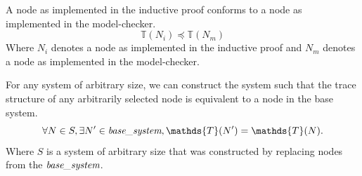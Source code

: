 \documentclass[runningheads]{llncs}
\newcommand{\basesystem}{\emph{base\_system}}
\newcommand{\tracestruc}[1]{\mathds{T}(#1)}
\newif\ifcomments
\newcommand{\egm}[1]{\ifcomments\textcolor{orange}{egm: #1}\fi}
\newcommand{\krs}[1]{\ifcomments\textcolor{blue}{krs: #1}\fi}
\begin{document}
\begin{lemma}
\label{lemma:ind_cof_model}
A node as implemented in the inductive proof conforms to a node as implemented in the model-checker.
$$\tracestruc{N_i} \preceq \tracestruc{N_m}$$
Where $N_i$ denotes a node as implemented in the inductive proof and $N_m$ denotes a node as implemented in the model-checker.
\end{lemma}
\egm{I'm not sure I understand what this condition means (the text in the following paragraphs didn't help entirely either).}
\krs{This is the brain blast. We can use conformance both to show a large system works the same as a small system as well as to make sure the system defined in the inductive proof works the same as the system defined in the model checker}

\begin{lemma}
\label{lemma:all_nodes_covered}
For any system of arbitrary size, we can construct the system such that the trace structure of any arbitrarily selected node is equivalent to a node in the base system.
$$
\forall N \in S, \exists N' \in \basesystem, \tracestruc{N'} = \tracestruc{N}.
$$
Where $S$ is a system of arbitrary size that was constructed by replacing nodes from the $\basesystem$. 
\end{lemma}
\end{document}
